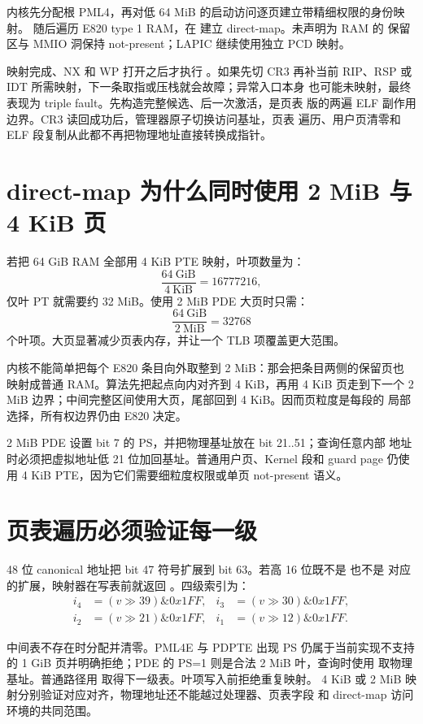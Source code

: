 内核先分配根 PML4，再对低 64 MiB 的启动访问逐页建立带精细权限的身份映射。
随后遍历 E820 type 1 RAM，在
 建立 direct-map。未声明为 RAM 的
保留区与 MMIO 洞保持 not-present；LAPIC 继续使用独立 PCD 映射。

映射完成、NX 和 WP 打开之后才执行 。如果先切 CR3
再补当前 RIP、RSP 或 IDT 所需映射，下一条取指或压栈就会故障；异常入口本身
也可能未映射，最终表现为 triple fault。先构造完整候选、后一次激活，是页表
版的两遍 ELF 副作用边界。CR3 读回成功后，管理器原子切换访问基址，页表
遍历、用户页清零和 ELF 段复制从此都不再把物理地址直接转换成指针。

\section{direct-map 为什么同时使用 2 MiB 与 4 KiB 页}

若把 64 GiB RAM 全部用 4 KiB PTE 映射，叶项数量为：
\[
 \frac{64\ \mathrm{GiB}}{4\ \mathrm{KiB}}=16777216,
\]
仅叶 PT 就需要约 32 MiB。使用 2 MiB PDE 大页时只需：
\[
 \frac{64\ \mathrm{GiB}}{2\ \mathrm{MiB}}=32768
\]
个叶项。大页显著减少页表内存，并让一个 TLB 项覆盖更大范围。

内核不能简单把每个 E820 条目向外取整到 2 MiB：那会把条目两侧的保留页也
映射成普通 RAM。算法先把起点向内对齐到 4 KiB，再用 4 KiB 页走到下一个
2 MiB 边界；中间完整区间使用大页，尾部回到 4 KiB。因而页粒度是每段的
局部选择，所有权边界仍由 E820 决定。

2 MiB PDE 设置 bit 7 的 PS，并把物理基址放在 bit 21..51；查询任意内部
地址时必须把虚拟地址低 21 位加回基址。普通用户页、Kernel 段和 guard page
仍使用 4 KiB PTE，因为它们需要细粒度权限或单页 not-present 语义。

\section{页表遍历必须验证每一级}

48 位 canonical 地址把 bit 47 符号扩展到 bit 63。若高 16 位既不是
 也不是  对应的扩展，映射器在写表前就返回
。四级索引为：
\[
\begin{aligned}
i_4&=(v\gg39)\mathbin{\&}0x1FF, &
i_3&=(v\gg30)\mathbin{\&}0x1FF,\\
i_2&=(v\gg21)\mathbin{\&}0x1FF, &
i_1&=(v\gg12)\mathbin{\&}0x1FF.
\end{aligned}
\]

中间表不存在时分配并清零。PML4E 与 PDPTE 出现 PS 仍属于当前实现不支持的
1 GiB 页并明确拒绝；PDE 的 PS=1 则是合法 2 MiB 叶，查询时使用
 取物理基址。普通路径用
 取得下一级表。叶项写入前拒绝重复映射。
4 KiB 或 2 MiB 映射分别验证对应对齐，物理地址还不能越过处理器、页表字段
和 direct-map 访问环境的共同范围。

